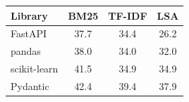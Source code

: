 \begin{tabular}{lccc}
\toprule
Library & BM25 & TF-IDF & LSA \\
\midrule
FastAPI & 37.7 & 34.4 & 26.2 \\
pandas & 38.0 & 34.0 & 32.0 \\
scikit-learn & 41.5 & 34.9 & 34.9 \\
Pydantic & 42.4 & 39.4 & 37.9 \\
\bottomrule
\end{tabular}
